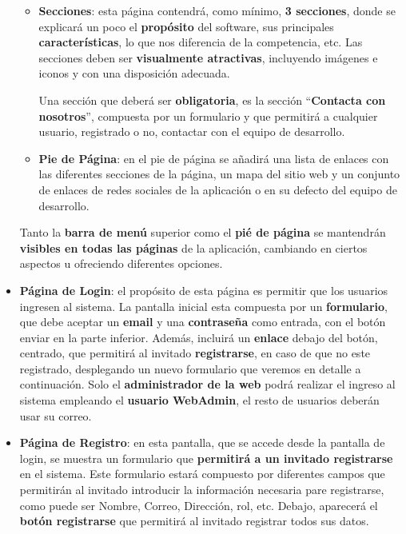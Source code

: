 \begin{appendices}
\begin{itemize}
\begin{itemize}
		\item \textbf{Secciones}: esta página contendrá, como mínimo, \textbf{3 secciones}, donde se explicará un poco el \textbf{propósito} del software, sus principales \textbf{características}, lo que nos diferencia de la competencia, etc. Las secciones deben ser \textbf{visualmente atractivas}, incluyendo imágenes e iconos y con una disposición adecuada. 
		
		Una sección que deberá ser \textbf{obligatoria}, es la sección ``\textbf{Contacta con nosotros}'', compuesta por un formulario y que permitirá a cualquier usuario, registrado o no, contactar con el equipo de desarrollo.
		
		\item \textbf{Pie de Página}: en el pie de página se añadirá una lista de enlaces con las diferentes secciones de la página, un mapa del sitio web y un conjunto de enlaces de redes sociales de la aplicación o en su defecto del equipo de desarrollo.
	\end{itemize}
	
	Tanto la \textbf{barra de menú} superior como el \textbf{pié de página} se mantendrán \textbf{visibles en todas las páginas} de la aplicación, cambiando en ciertos aspectos u ofreciendo diferentes opciones.
	
	\item \textbf{Página de Login}: el propósito de esta página es permitir que los usuarios ingresen al sistema. La pantalla inicial esta compuesta por un \textbf{formulario}, que debe aceptar un \textbf{email} y una \textbf{contraseña} como entrada, con el botón enviar en la parte inferior. Además, incluirá un \textbf{enlace} debajo del botón, centrado, que permitirá al invitado \textbf{registrarse}, en caso de que no este registrado, desplegando un nuevo formulario que veremos en detalle a continuación. Solo el \textbf{administrador de la web} podrá realizar el ingreso al sistema empleando el \textbf{usuario WebAdmin}, el resto de usuarios deberán usar su correo.
	
	\item \textbf{Página de Registro}: en esta pantalla, que se accede desde la pantalla de login, se muestra un formulario que \textbf{permitirá a un invitado registrarse} en el sistema. Este formulario estará compuesto por diferentes campos que permitirán al invitado introducir la información necesaria pare registrarse, como puede ser Nombre, Correo, Dirección, rol, etc. Debajo, aparecerá el \textbf{botón registrarse} que permitirá al invitado registrar todos sus datos.  


\end{itemize}
\end{appendices}
